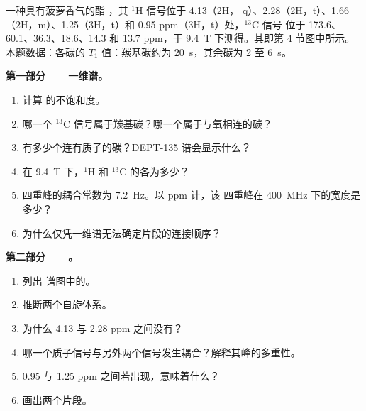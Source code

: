 \begin{problem}
\label{pb:b3:advanced-nmr:1}
一种具有菠萝香气的酯 ，其 ${}^1$H 信号位于 4.13（2H，
q）、2.28（2H，t）、1.66（2H，m）、1.25（3H，t）和 0.95 ppm（3H，t）处，${}^{13}$C 信号
位于 173.6、60.1、36.3、18.6、14.3 和 13.7 ppm，于 \qty{9.4}{T} 下测得。其即第 4 节图中所示。本题数据：各碳的 $T_1$
值：羰基碳约为 \qty{20}{s}，其余碳为 2 至
\qty{6}{s}。

\medskip\noindent\textbf{第一部分——一维谱。}
\begin{enumerate}
  \item 计算  的不饱和度。
  \item 哪一个 ${}^{13}$C 信号属于羰基碳？哪一个属于与氧相连的碳？
  \item 有多少个连有质子的碳？DEPT-135 谱会显示什么？
  \item 在 \qty{9.4}{T} 下，${}^1$H 和 ${}^{13}$C 的各为多少？
  \item 四重峰的耦合常数为 \qty{7.2}{Hz}。以 ppm 计，该
        四重峰在 \qty{400}{MHz} 下的宽度是多少？
  \item 为什么仅凭一维谱无法确定片段的连接顺序？
\end{enumerate}

\medskip\noindent\textbf{第二部分——。}
\begin{enumerate}[resume]
  \item 列出  谱图中的。
  \item 推断两个自旋体系。
  \item 为什么 4.13 与 2.28 ppm 之间没有？
  \item 哪一个质子信号与另外两个信号发生耦合？解释其峰的多重性。
  \item 0.95 与 1.25 ppm 之间若出现，意味着什么？
  \item 画出两个片段。
\end{enumerate}


\end{problem}
